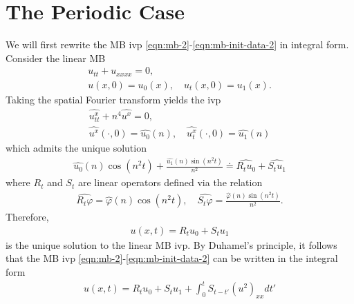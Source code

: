 \documentclass[12pt,reqno]{amsart}
\numberwithin{equation}{section}  %
\numberwithin{figure}{section}
\newcommand{\wh}{\widehat}
\newcommand{\vp}{\varphi}
\begin{document}
        \section{The Periodic Case} 
        \label{sec:periodic-case}
        We will first rewrite the MB ivp
        \eqref{eqn:mb-2}-\eqref{eqn:mb-init-data-2} in integral form. Consider
        the linear MB
        \begin{gather}
          u_{tt} + u_{xxxx} = 0,
          \label{lin-mb}
          \\
          u(x, 0)=u_{0}(x), \quad u_{t}(x,0) = u_{1}(x).
          \label{lin-mb-init-data-1}
        \end{gather}
       Taking the spatial Fourier transform yields the ivp
       \begin{gather*}
         \wh{u_{tt}^{x}} + n^{4} \wh{u^{x}} = 0,
         \\
         \wh{u^{x}}(\cdot, 0) = \wh{u_{0}}(n), \quad
         \wh{u_{t}^{x}}(\cdot, 0) = \wh{u_{1}}(n)
       \end{gather*}
       which admits the unique solution
       \begin{equation*}
       \begin{split}
         \wh{u_{0}}(n) \cos(n^{2}t) + 
         \frac{\wh{u_{1}}(n) \sin(n^{2}t)}{n^{2}} \doteq
         \wh{R_{t} u_{0}} + \wh{S_{t} u_{1}}
       \end{split}
       \end{equation*}
       where $R_{t}$ and $S_{t}$ are linear operators defined via the relation
       \begin{gather*}
         \wh{R_{t}\vp} = \wh{\vp}(n) \cos(n^{2}t), \quad 
         \wh{S_{t}\vp} = \frac{\wh{\vp}(n) \sin(n^{2}t)}{n^{2}}.
       \end{gather*}
       Therefore,
       \begin{equation*}
       \begin{split}
         u(x,t) = R_{t}u_{0} + S_{t}u_{1}
       \end{split}
       \end{equation*}
       is the unique solution to the linear MB ivp. By Duhamel's principle, it
       follows that the MB ivp \eqref{eqn:mb-2}-\eqref{eqn:mb-init-data-2} can
       be written in the integral form
       \begin{equation}
       \begin{split}
         u(x,t) = R_{t}u_{0} + S_{t}u_{1} + \int_{0}^{t} S_{t-t'}
         (u^{2})_{xx} dt'
       \end{split}
       \label{eqn:integral-form}
       \end{equation}
       
\end{document}
